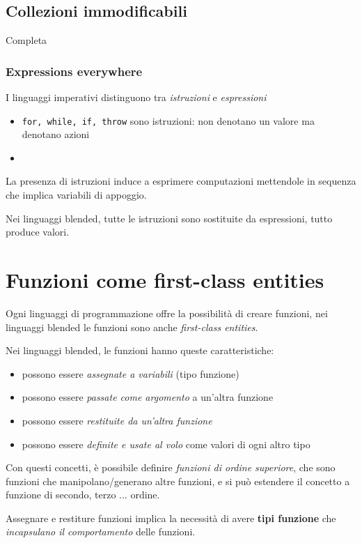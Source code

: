\subsection{Collezioni immodificabili}
Completa

\subsubsection{Expressions everywhere}
I linguaggi imperativi distinguono tra \textit{istruzioni} e \textit{espressioni}
\begin{itemize}
    \item \texttt{for, while, if, throw} sono istruzioni: non denotano un valore ma denotano azioni
    \item 
\end{itemize}

La presenza di istruzioni induce a esprimere computazioni mettendole in sequenza che implica variabili di appoggio.

Nei linguaggi blended, tutte le istruzioni sono sostituite da espressioni, tutto produce valori.

\section{Funzioni come first-class entities}
Ogni linguaggi di programmazione offre la possibilità di creare funzioni, nei linguaggi blended le funzioni sono anche \textit{first-class entities}.

Nei linguaggi blended, le funzioni hanno queste caratteristiche:
\begin{itemize}
    \item possono essere \textit{assegnate a variabili} (tipo funzione)
    \item possono essere \textit{passate come argomento} a un'altra funzione
    \item possono essere \textit{restituite da un'altra funzione}
    \item possono essere \textit{definite e usate al volo} come valori di ogni altro tipo
\end{itemize}

Con questi concetti, è possibile definire \textit{funzioni di ordine superiore}, che sono funzioni che manipolano/generano altre funzioni, e si può estendere il concetto a funzione di secondo, terzo ... ordine.

Assegnare e restiture funzioni implica la necessità di avere \textbf{tipi funzione} che \textit{incapsulano il comportamento} delle funzioni.

